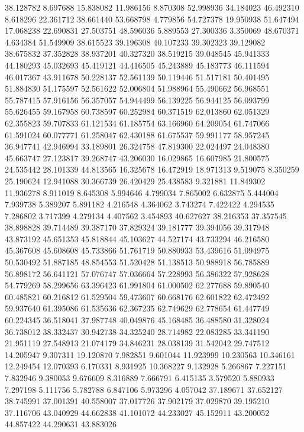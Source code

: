 38.128782
8.697688
15.838082
11.986156
8.870308
52.998936
34.184023
46.492310
8.618296
22.361712
38.661440
53.668798
4.779856
54.727378
19.950938
51.647494
17.068238
22.690831
27.503751
48.596036
5.889553
27.300336
3.350069
48.670371
4.634384
51.549909
38.615523
39.196308
40.107233
39.302323
39.129082
38.675832
37.352828
38.937201
40.327320
38.519215
39.048545
45.941333
44.180293
45.032693
45.419121
44.416505
45.243889
45.183773
46.111594
46.017367
43.911678
50.228137
52.561139
50.119446
51.517181
50.401495
51.884830
51.175597
52.561622
52.006804
51.988964
55.490662
56.968551
55.787415
57.916156
56.357057
54.944499
56.139225
56.944125
56.093799
55.626455
59.167958
60.738597
60.252984
60.371519
62.013860
62.051329
62.355823
59.707833
61.121534
61.185754
63.166960
64.209054
61.747066
61.591024
60.077771
61.258047
62.430188
61.675537
59.991177
58.957245
36.947741
42.946994
33.189801
26.324758
47.819300
22.024497
24.048380
45.663747
27.123817
39.268747
43.206030
16.029865
16.607985
21.800575
24.535442
28.101339
44.813565
16.325678
16.472919
18.971313
9.519075
8.350259
25.190624
12.941088
30.366739
26.420429
25.438583
9.321881
11.849302
11.936278
8.911019
8.645308
5.994646
4.799034
7.865002
6.632875
5.444004
7.939738
5.389207
5.891182
4.216548
4.364062
3.743274
7.422422
4.294535
7.286802
3.717399
4.279134
4.407562
3.454893
40.627627
38.216353
37.357545
38.898828
39.714489
39.387170
37.829324
39.181777
39.394056
39.317948
43.873192
45.651353
45.818844
45.103627
44.527174
43.733294
46.216580
45.367608
45.608608
45.733866
51.761719
50.880933
53.439616
51.094975
50.530492
51.887185
48.854553
51.520428
51.138513
50.988918
56.785889
56.898172
56.641121
57.076747
57.036664
57.228993
56.386322
57.928628
54.779269
58.299656
63.396423
61.991804
61.000502
62.277688
59.890540
60.485821
60.216812
61.529504
59.473607
60.668176
62.601822
62.472492
59.937640
61.395086
61.535636
62.367235
62.749629
62.778654
61.447749
60.224345
36.518041
37.987748
40.049876
45.168485
36.488580
31.328024
36.738012
38.332437
30.942738
34.325240
28.714982
22.083285
33.341190
21.951119
27.548913
21.074179
34.846231
28.038139
31.542042
29.747512
14.205947
9.307311
19.120870
7.982851
9.601044
11.923999
10.230563
10.346161
12.249454
12.070393
6.170331
8.931925
10.368227
9.132928
5.266867
7.227151
7.832946
9.380053
9.676609
8.316889
7.666791
6.415135
3.579520
5.880933
7.297198
5.111756
5.782788
6.847106
5.973296
4.057042
37.189671
37.652127
38.745991
37.001391
40.558007
37.017726
37.902179
37.029870
39.195210
37.116706
43.040929
44.662838
41.101072
44.233027
45.152911
43.200052
44.857422
44.290631
43.883026
